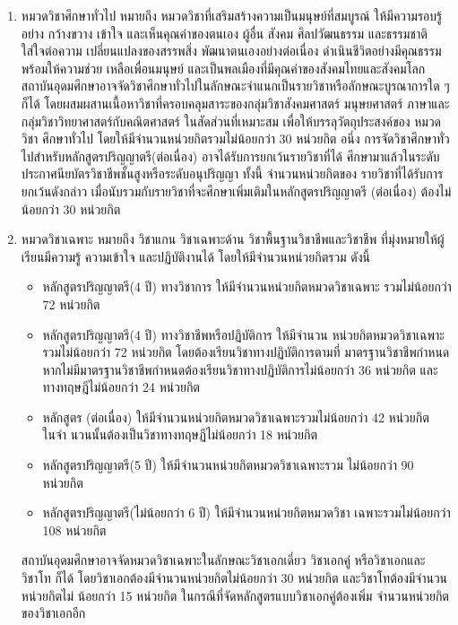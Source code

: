 \begin{enumerate}
  \item  หมวดวิชาศึกษาทั่วไป หมายถึง หมวดวิชาที่เสริมสร้างความเป็นมนุษย์ที่สมบูรณ์ ให้มีความรอบรู้อย่าง
  กว้างขวาง เข้าใจ และเห็นคุณค่าของตนเอง ผู้อื่น สังคม ศิลปวัฒนธรรม และธรรมชาติ ใส่ใจต่อความ
  เปลี่ยนแปลงของสรรพสิ่ง พัฒนาตนเองอย่างต่อเนื่อง ดําเนินชีวิตอย่างมีคุณธรรม พร้อมให้ความช่วย
  เหลือเพื่อนมนุษย์ และเป็นพลเมืองที่มีคุณค่าของสังคมไทยและสังคมโลก
  สถาบันอุดมศึกษาอาจจัดวิชาศึกษาทั่วไปในลักษณะจําแนกเป็นรายวิชาหรือลักษณะบูรณาการใด ๆ
  ก็ได้ โดยผสมผสานเนื้อหาวิชาที่ครอบคลุมสาระของกลุ่มวิชาสังคมศาสตร์ มนุษยศาสตร์ ภาษาและ
  กลุ่มวิชาวิทยาศาสตร์กับคณิตศาสตร์ ในสัดส่วนที่เหมาะสม เพื่อให้บรรลุวัตถุประสงค์ของ หมวดวิชา
  ศึกษาทั่วไป โดยให้มีจํานวนหน่วยกิตรวมไม่น้อยกว่า 30 หน่วยกิต
  อนึ่ง การจัดวิชาศึกษาทั่วไปสําหรับหลักสูตรปริญญาตรี(ต่อเนื่อง) อาจได้รับการยกเว้นรายวิชาที่ได้
  ศึกษามาแล้วในระดับประกาศนียบัตรวิชาชีพชั้นสูงหรือระดับอนุปริญญา ทั้งนี้ จํานวนหน่วยกิตของ
  รายวิชาที่ได้รับการยกเว้นดังกล่าว เมื่อนับรวมกับรายวิชาที่จะศึกษาเพิ่มเติมในหลักสูตรปริญญาตรี
  (ต่อเนื่อง) ต้องไม่น้อยกว่า 30 หน่วยกิต
  \item หมวดวิชาเฉพาะ หมายถึง วิชาแกน วิชาเฉพาะด้าน วิชาพื้นฐานวิชาชีพและวิชาชีพ ที่มุ่งหมายให้ผู้
  เรียนมีความรู้ ความเข้าใจ และปฏิบัติงานได้ โดยให้มีจํานวนหน่วยกิตรวม ดังนี้
  \begin{itemize}
    \item หลักสูตรปริญญาตรี(4 ปี) ทางวิชาการ ให้มีจํานวนหน่วยกิตหมวดวิชาเฉพาะ รวมไม่น้อยกว่า
    72 หน่วยกิต
    \item หลักสูตรปริญญาตรี(4 ปี) ทางวิชาชีพหรือปฏิบัติการ ให้มีจํานวน หน่วยกิตหมวดวิชาเฉพาะ
    รวมไม่น้อยกว่า 72 หน่วยกิต โดยต้องเรียนวิชาทางปฏิบัติการตามที่ มาตรฐานวิชาชีพกําหนด
    หากไม่มีมาตรฐานวิชาชีพกําหนดต้องเรียนวิชาทางปฏิบัติการไม่น้อยกว่า 36 หน่วยกิต และ
    ทางทฤษฎีไม่น้อยกว่า 24 หน่วยกิต
    \item หลักสูตร (ต่อเนื่อง) ให้มีจํานวนหน่วยกิตหมวดวิชาเฉพาะรวมไม่น้อยกว่า 42 หน่วยกิต ในจํา
    นวนนั้นต้องเป็นวิชาทางทฤษฏีไม่น้อยกว่า 18 หน่วยกิต
    \item หลักสูตรปริญญาตรี(5 ปี) ให้มีจํานวนหน่วยกิตหมวดวิชาเฉพาะรวม ไม่น้อยกว่า 90 หน่วยกิต
    \item  หลักสูตรปริญญาตรี(ไม่น้อยกว่า 6 ปี) ให้มีจํานวนหน่วยกิตหมวดวิชา เฉพาะรวมไม่น้อยกว่า
    108 หน่วยกิต
 \end{itemize}
 สถาบันอุดมศึกษาอาจจัดหมวดวิชาเฉพาะในลักษณะวิชาเอกเดี่ยว วิชาเอกคู่ หรือวิชาเอกและวิชาโท
ก็ได้ โดยวิชาเอกต้องมีจํานวนหน่วยกิตไม่น้อยกว่า 30 หน่วยกิต และวิชาโทต้องมีจํานวนหน่วยกิตไม่
น้อยกว่า 15 หน่วยกิต ในกรณีที่จัดหลักสูตรแบบวิชาเอกคู่ต้องเพิ่ม จํานวนหน่วยกิตของวิชาเอกอีก

\end{enumerate}

